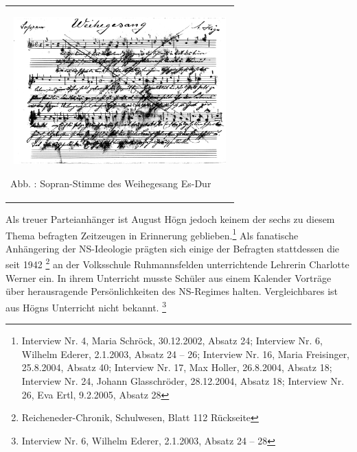\documentclass[a4paper]{article}
\newcounter{Abb}
\renewcommand\theAbb{\arabic{Abb}}
\begin{document}
\begin{center}
\begin{minipage}{8.835cm}
\begin{center}
\tablefirsthead{}
\tablehead{}
\tabletail{}
\tablelasttail{}
\begin{supertabular}{m{8.635cm}}

\includegraphics[width=8.453cm,height=5.678cm]{pictures/zulassungsarbeit-img035.png}

Abb. \stepcounter{Abb}{\theAbb}: Sopran-Stimme des Weihegesang Es-Dur\\
\end{supertabular}
\end{center}
\end{minipage}
\end{center}
Als treuer Parteianhänger ist August Högn jedoch keinem der sechs zu
diesem Thema befragten Zeitzeugen in Erinnerung geblieben.\footnote{
Interview Nr. 4, Maria Schröck, 30.12.2002, Absatz 24; Interview Nr. 6,
Wilhelm Ederer, 2.1.2003, Absatz 24 – 26; Interview Nr. 16, Maria
Freisinger, 25.8.2004, Absatz 40; Interview Nr. 17, Max Holler,
26.8.2004, Absatz 18; Interview Nr. 24, Johann Glasschröder,
28.12.2004, Absatz 18; Interview Nr. 26, Eva Ertl, 9.2.2005, Absatz 28}
Als fanatische Anhängering der NS-Ideologie prägten sich einige der
Befragten stattdessen die seit 1942 \footnote{Reicheneder-Chronik,
Schulwesen, Blatt 112 Rückseite} an der Volksschule Ruhmannsfelden
unterrichtende Lehrerin Charlotte Werner ein. In ihrem Unterricht
musste Schüler aus einem Kalender Vorträge über herausragende
Persönlichkeiten des NS-Regimes halten. Vergleichbares ist aus Högns
Unterricht nicht bekannt. \footnote{Interview Nr. 6, Wilhelm Ederer,
2.1.2003, Absatz 24 – 28}
\end{document}
